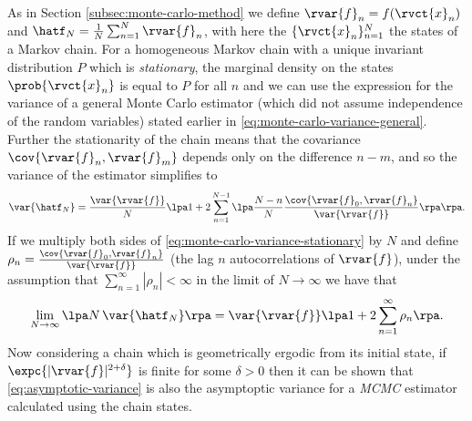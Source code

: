 As in Section \ref{subsec:monte-carlo-method} we define $\rvar{f}_n = f(\rvct{x}_n)$ and $\hatf_N = \frac{1}{N} \sum_{n=1}^N \rvar{f}_n$, with here the $\lbrace \rvct{x}_n \rbrace_{n=1}^N$ the states of a Markov chain. For a homogeneous Markov chain with a unique invariant distribution $P$ which is \emph{stationary}, the marginal density on the states $\prob{\rvct{x}_n}$ is equal to $P$ for all $n$ and we can use the expression for the variance of a general Monte Carlo estimator (which did not assume independence of the random variables) stated earlier in \eqref{eq:monte-carlo-variance-general}. Further the stationarity of the chain means that the covariance $\cov{\rvar{f}_n, \rvar{f}_m}$ depends only on the difference $n - m$, and so the variance of the estimator simplifies to
\begin{equation}\label{eq:monte-carlo-variance-stationary}
  \var{\hatf_N}
  =
  \frac{\var{\rvar{f}}}{N}
  \lpa 
    1 + 2\sum_{n=1}^{N-1} \lpa \frac{N-n}{N} \frac{\cov{\rvar{f}_0, \rvar{f}_n}}{\var{\rvar{f}}}\rpa
  \rpa.
\end{equation}
If we multiply both sides of \eqref{eq:monte-carlo-variance-stationary} by $N$ and define $\rho_{n} = \frac{\cov{\rvar{f}_0, \rvar{f}_n}}{\var{\rvar{f}}}$ (the lag $n$ autocorrelations of $\rvar{f}$), under the assumption that $\sum_{n=1}^\infty |\rho_n| < \infty$ in the limit of $N \to \infty$ we have that
\begin{equation}\label{eq:asymptotic-variance}
  \lim_{N\to\infty} \lpa N \, \var{\hatf_N} \rpa = \var{\rvar{f}} \lpa 1 + 2\sum_{n=1}^\infty \rho_n\rpa.
\end{equation}
Now considering a chain which is geometrically ergodic from its initial state, if $\expc{|\rvar{f}|^{2+\delta}}$ is finite for some $\delta > 0$ then it can be shown \citep{chan1994discussion,geyer1998markov,roberts2004general} that \eqref{eq:asymptotic-variance} is also the asymptoptic variance for a \emph{MCMC} estimator calculated using the chain states.

